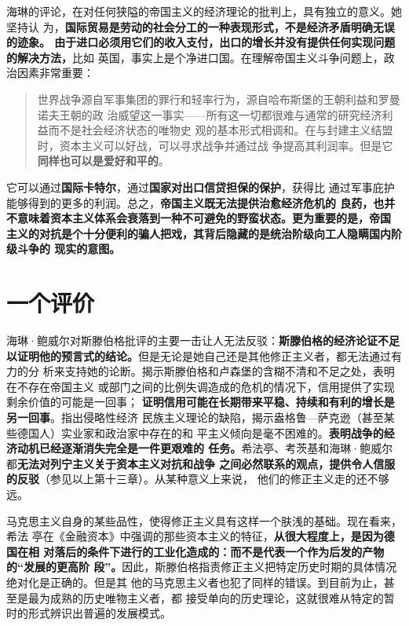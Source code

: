 海琳的评论，在对任何狭隘的帝国主义的经济理论的批判上，具有独立的意义。她坚持认
为，\textbf{国际贸易是劳动的社会分工的一种表现形式，不是经济矛盾明确无误的迹象。
  由于进口必须用它们的收入支付，出口的增长并没有提供任何实现问题的解决方法，}比如
英国，事实上是个净进口国。在理解帝国主义斗争问题上，政治因素非常重要：
\begin{quotation}
  世界战争源自军事集团的罪行和轻率行为，源自哈布斯堡的王朝利益和罗曼诺夫王朝的政
  治威望这一事实——所有这一切都很难与通常的研究经济利益而不是社会经济状态的唯物史
  观的基本形式相调和。在与封建主义结盟时，资本主义可以好战，可以寻求战争并通过战
  争提高其利润率。但是它\textbf{同样也可以是爱好和平的}。
\end{quotation}

它可以通过\textbf{国际卡特尔}，通过\textbf{国家对出口信贷担保的保护}，获得比
通过军事庇护能够得到的更多的利润。总之，\textbf{帝国主义既无法提供治愈经济危机的
良药，也并不意味着资本主义体系会衰落到一种不可避免的野蛮状态。更为重要的是，帝国
主义的对抗是个十分便利的骗人把戏，其背后隐藏的是统治阶级向工人隐瞒国内阶级斗争的
现实的意图。}

\section{一个评价}

海琳·鲍威尔对斯滕伯格批评的主要一击让人无法反驳：\textbf{斯滕伯格的经济论证不足
以证明他的预言式的结论。}但是无论是她自己还是其他修正主义者，都无法通过有力的分
析来支持她的论断。揭示斯滕伯格和卢森堡的含糊不清和不足之处，表明在不存在帝国主义
或部门之间的比例失调造成的危机的情况下，信用提供了实现剩余价值的可能是一回事；
\textbf{证明信用可能在长期带来平稳、持续和有利的增长是另一回事}。指出侵略性经济
民族主义理论的缺陷，揭示盎格鲁—萨克逊（甚至某些德国人）实业家和政治家中存在的和
平主义倾向是毫不困难的。\textbf{表明战争的经济动机已经逐渐消失完全是一件更艰难的
任务。}希法亭、考茨基和海琳·鲍威尔都\textbf{无法对列宁主义关于资本主义对抗和战争
之间必然联系的观点，提供令人信服的反驳}（参见以上第十三章）。从某种意义上来说，
他们的修正主义走的还不够远。

马克思主义自身的某些品性，使得修正主义具有这样一个肤浅的基础。现在看来，希法
亭在《金融资本》中强调的那些资本主义的特征，\textbf{从很大程度上，是因为德国在相
对落后的条件下进行的工业化造成的：而不是代表一个作为后发的产物的“发展的更高阶
段”。}因此，斯滕伯格指责修正主义把特定历史时期的具体情况绝对化是正确的。但是其
他的马克思主义者也犯了同样的错误。到目前为止，甚至是最为成熟的历史唯物主义者，都
接受单向的历史理论，这就很难从特定的暂时的形式辨识出普遍的发展模式。

